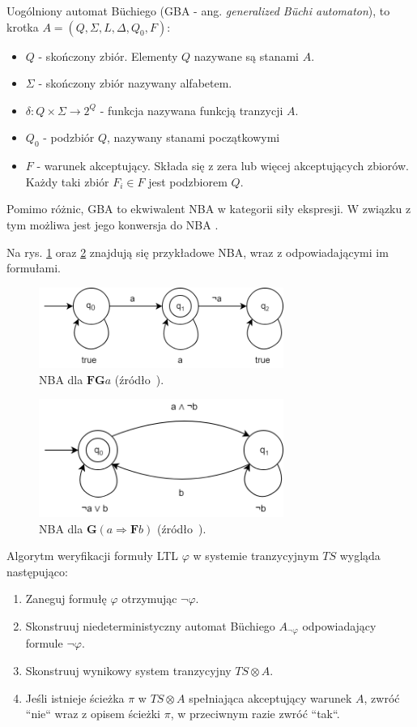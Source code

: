 Uogólniony automat Büchiego (GBA - ang. \textit{generalized Büchi automaton}), to krotka $A = (Q,\Sigma,L,\Delta,Q_0,F)$:
\begin{itemize}
\item $Q$ - skończony zbiór. Elementy $Q$ nazywane są stanami $A$.
\item $\Sigma$ - skończony zbiór nazywany alfabetem.
\item $\delta: Q \times \Sigma \rightarrow 2^Q$ - funkcja nazywana funkcją tranzycji $A$.
\item $Q_0$ - podzbiór $Q$, nazywany stanami początkowymi
\item $F$ - warunek akceptujący. Składa się z zera lub więcej akceptujących zbiorów. Każdy taki zbiór $F_i \in F$ jest podzbiorem $Q$.
\end{itemize}
Pomimo różnic, GBA to ekwiwalent NBA w kategorii siły ekspresji.
W związku z tym możliwa jest jego konwersja do NBA \cite{Mer14}\cite{Dol95}.

Na rys. \ref{fig:nba1} oraz \ref{fig:nba2} znajdują się przykładowe NBA, wraz z odpowiadającymi im formułami.

\begin{figure}[h]
    \centering
    \includegraphics[width=8cm,keepaspectratio]{img/nba1.png}
    \caption{NBA dla $\mathbf{FG}a$ (źródło~\cite{Bai08}).}
    \label{fig:nba1}
\end{figure}
\begin{figure}[h]
    \centering
    \includegraphics[width=8cm,keepaspectratio]{img/nba2.png}
    \caption{NBA dla $\mathbf{G}(a \Rightarrow \mathbf{F}b)$ (źródło~\cite{Bai08}).}
    \label{fig:nba2}
\end{figure}

\noindent
Algorytm weryfikacji formuły LTL $\varphi$ w systemie tranzycyjnym $TS$ wygląda następująco:
\begin{enumerate}
    \item Zaneguj formułę $\varphi$ otrzymując $\neg\varphi$.
    \item Skonstruuj niedeterministyczny automat Büchiego $A_{\neg\varphi}$ odpowiadający formule $\neg\varphi$.
    \item Skonstruuj wynikowy system tranzycyjny $TS \otimes A$.
    \item Jeśli istnieje ścieżka $\pi$ w $TS \otimes A$ spełniająca akceptujący warunek $A$, zwróć ``nie`` wraz z opisem ścieżki $\pi$, w przeciwnym razie zwróć ``tak``.
\end{enumerate}

